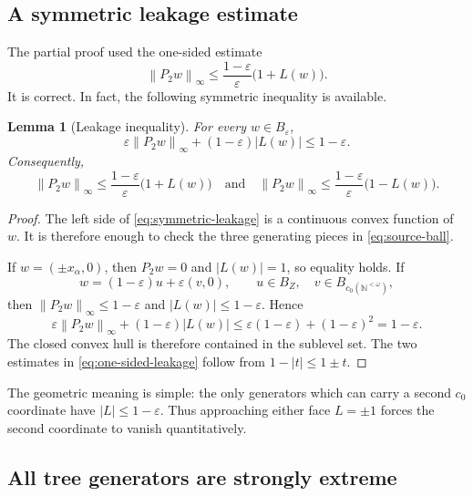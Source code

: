 \documentclass[11pt]{article}
\newtheorem{lemma}[theorem]{Lemma}
\newcommand{\N}{\mathbb N}
\newcommand{\eps}{\varepsilon}
\newcommand{\norm}[1]{\left\lVert #1\right\rVert}
\newcommand{\abs}[1]{\left\lvert #1\right\rvert}
\begin{document}
\subsection{A symmetric leakage estimate}

The partial proof used the one-sided estimate
\[
 \norm{P_2w}_\infty\le \frac{1-\eps}{\eps}\bigl(1+L(w)\bigr).
\]
It is correct.  In fact, the following symmetric inequality is available.

\begin{lemma}[Leakage inequality]
\label{lem:leakage}
For every $w\in B_\eps$,
\begin{equation}
\label{eq:symmetric-leakage}
 \eps\norm{P_2w}_\infty+(1-\eps)\abs{L(w)}\le 1-\eps.
\end{equation}
Consequently,
\begin{equation}
\label{eq:one-sided-leakage}
 \norm{P_2w}_\infty
 \le \frac{1-\eps}{\eps}\bigl(1+L(w)\bigr)
 \quad\text{and}\quad
 \norm{P_2w}_\infty
 \le \frac{1-\eps}{\eps}\bigl(1-L(w)\bigr).
\end{equation}
\end{lemma}

\begin{proof}
The left side of \eqref{eq:symmetric-leakage} is a continuous convex function of $w$.  It is therefore enough to check the three generating pieces in \eqref{eq:source-ball}.

If $w=(\pm x_\alpha,0)$, then $P_2w=0$ and $\abs{L(w)}=1$, so equality holds.  If
\[
 w=(1-\eps)u+\eps(v,0),
 \qquad u\in B_Z,\quad v\in B_{c_0(\N^{<\omega})},
\]
then $\norm{P_2w}_\infty\le1-\eps$ and $\abs{L(w)}\le1-\eps$.  Hence
\[
 \eps\norm{P_2w}_\infty+(1-\eps)\abs{L(w)}
 \le \eps(1-\eps)+(1-\eps)^2=1-\eps.
\]
The closed convex hull is therefore contained in the sublevel set.  The two estimates in \eqref{eq:one-sided-leakage} follow from $1-\abs{t}\le1\pm t$.
\end{proof}

The geometric meaning is simple: the only generators which can carry a second $c_0$ coordinate have $\abs{L}\le1-\eps$.  Thus approaching either face $L=\pm1$ forces the second coordinate to vanish quantitatively.

\subsection{All tree generators are strongly extreme}
\end{document}
